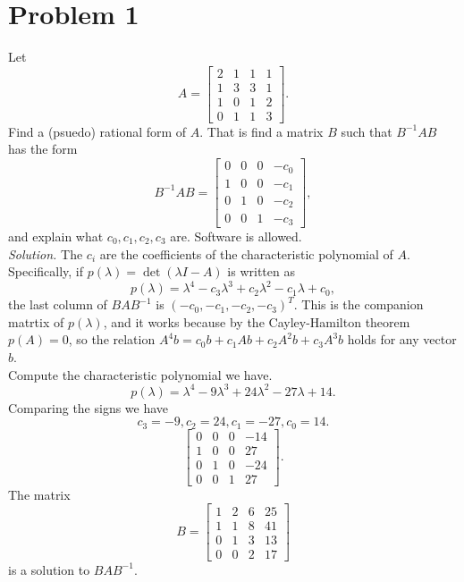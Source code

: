 \documentclass[12pt]{article}
\begin{document}
\section*{Problem 1}
Let
\[
    A=
    \begin{bmatrix}
        2&1&1&1\\
        1&3&3&1\\
        1&0&1&2\\
        0&1&1&3
    \end{bmatrix}.
\]
Find a (psuedo) rational form of $A$. That is find a matrix $B$ such that $B^{-1}AB$ has the form
\[
    B^{-1}AB=
    \begin{bmatrix}
        0&0&0&-c_0\\
        1&0&0&-c_1\\
        0&1&0&-c_2\\
        0&0&1&-c_3
    \end{bmatrix},
\]
and explain what $c_0,c_1,c_2,c_3$ are. Software is allowed.\\
\textit{Solution.} The $c_i$ are the coefficients of the characteristic polynomial of $A$. Specifically, if $p(\lambda) = \det(\lambda I-A)$ is written as
\[
    p(\lambda)=\lambda^4-c_3\lambda^3+c_2\lambda^2-c_1\lambda+c_0,
\]
the last column of $BAB^{-1}$ is $(-c_0,-c_1,-c_2,-c_3)^T$. This is the companion matrtix of $p(\lambda)$, and it works because by the Cayley-Hamilton theorem $p(A)=0$, so the relation $A^4b=c_0b+c_1Ab+c_2A^2b+c_3A^3b$ holds for any vector $b$.\\
Compute the characteristic polynomial we have. 
\[
    p(\lambda)=\lambda^4-9\lambda^3+24\lambda^2-27\lambda+14.
\]
Comparing the signs we have
\[
    c_3=-9,c_2=24,c_1=-27,c_0=14.
\]
\[
    \begin{bmatrix}
        0&0&0&-14\\
        1&0&0&27\\
        0&1&0&-24\\
        0&0&1&27
    \end{bmatrix}.
\]
The matrix
\[
    B=
    \begin{bmatrix}
        1&2&6&25\\
        1&1&8&41\\
        0&1&3&13\\
        0&0&2&17
    \end{bmatrix}
\]
is a solution to $BAB^{-1}$.
\end{document}
